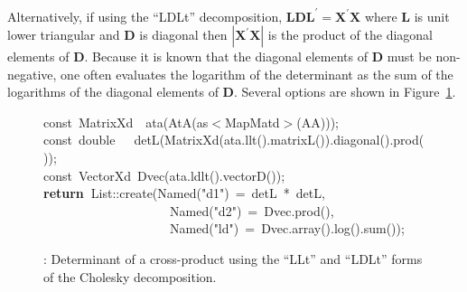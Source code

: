 \documentclass[shortnames,article,nojss]{jss}
\newcommand{\hlstd}[1]{\textcolor[rgb]{0,0,0}{#1}}
\newcommand{\hlopt}[1]{\textcolor[rgb]{0,0,0}{#1}}
\newcommand{\hlstr}[1]{\textcolor[rgb]{0.90,0.15,0.15}{#1}}
\newcommand{\hlkwa}[1]{\textcolor[rgb]{0.61,0.13,0.93}{\bf{#1}}}
\newcommand{\hlkwb}[1]{\textcolor[rgb]{0.13,0.54,0.13}{#1}}
\newcommand{\hlkwd}[1]{\textcolor[rgb]{0,0,0}{#1}}
\begin{document}
Alternatively, if using the ``LDLt'' decomposition, $\bm L\bm D\bm
L^\prime=\bm X^\prime\bm X$ where $\bm L$ is unit lower triangular and
$\bm D$ is diagonal then $|\bm X^\prime\bm X|$ is the product of the
diagonal elements of $\bm D$.  Because it is known that the diagonal
elements of $\bm D$ must be non-negative, one often evaluates the
logarithm of the determinant as the sum of the logarithms of the
diagonal elements of $\bm D$.  Several options are shown in
Figure~\ref{cholDet}.

\begin{figure}[htb]
    \noindent
    \ttfamily
    \hlstd{}\hlkwb{const\ }\hlstd{MatrixXd}\hlstd{\ \ }\hlstd{}\hlkwd{ata}\hlstd{}\hlopt{(}\hlstd{}\hlkwd{AtA}\hlstd{}\hlopt{(}\hlstd{as}\hlopt{$<$}\hlstd{MapMatd}\hlopt{$>$(}\hlstd{AA}\hlopt{)));}\hspace*{\fill}\\
    \hlstd{}\hlkwb{const\ double}\hlstd{\ \ \ }\hlkwb{}\hlstd{}\hlkwd{detL}\hlstd{}\hlopt{(}\hlstd{}\hlkwd{MatrixXd}\hlstd{}\hlopt{(}\hlstd{ata}\hlopt{.}\hlstd{}\hlkwd{llt}\hlstd{}\hlopt{().}\hlstd{}\hlkwd{matrixL}\hlstd{}\hlopt{()).}\hlstd{}\hlkwd{diagonal}\hlstd{}\hlopt{().}\hlstd{}\hlkwd{prod}\hlstd{}\hlopt{());}\hspace*{\fill}\\
    \hlstd{}\hlkwb{const\ }\hlstd{VectorXd\ }\hlkwd{Dvec}\hlstd{}\hlopt{(}\hlstd{ata}\hlopt{.}\hlstd{}\hlkwd{ldlt}\hlstd{}\hlopt{().}\hlstd{}\hlkwd{vectorD}\hlstd{}\hlopt{());}\hspace*{\fill}\\
    \hlstd{}\hlkwa{return\ }\hlstd{List}\hlopt{::}\hlstd{}\hlkwd{create}\hlstd{}\hlopt{(}\hlstd{Named}\hlopt{{(}}\hlstd{}\hlstr{"d1"}\hlstd{}\hlopt{{)}\ =\ }\hlstd{detL\ }\hlopt{{*}\ }\hlstd{detL}\hlopt{,}\hspace*{\fill}\\
    \hlstd{}\hlstd{\ \ \ \ \ \ \ \ \ \ \ \ \ \ \ \ \ \ \ \ }\hlstd{Named}\hlopt{{(}}\hlstd{}\hlstr{"d2"}\hlstd{}\hlopt{{)}\ =\ }\hlstd{Dvec}\hlopt{.}\hlstd{}\hlkwd{prod}\hlstd{}\hlopt{(),}\hspace*{\fill}\\
    \hlstd{}\hlstd{\ \ \ \ \ \ \ \ \ \ \ \ \ \ \ \ \ \ \ \ }\hlstd{Named}\hlopt{{(}}\hlstd{}\hlstr{"ld"}\hlstd{}\hlopt{{)}\ =\ }\hlstd{Dvec}\hlopt{.}\hlstd{}\hlkwd{array}\hlstd{}\hlopt{().}\hlstd{}\hlkwd{log}\hlstd{}\hlopt{().}\hlstd{}\hlkwd{sum}\hlstd{}\hlopt{());}\hlstd{}\hspace*{\fill}\\
    \mbox{}
    \normalfont
    \normalsize
  \caption{: Determinant of a cross-product using
    the ``LLt'' and ``LDLt'' forms of the Cholesky decomposition.}
  \label{cholDet}
\end{figure}
\end{document}

